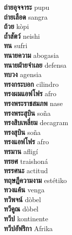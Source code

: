 \textbf{ ถ่ายอุจจาระ  } pupu \\
\textbf{ ถ่ายเลือด  } sangra \\
\textbf{ ถ้วย  } kòpi \\
\textbf{ ถ้ำสัตว์  } neishi \\
\textbf{ ทน  } sufri \\
\textbf{ ทนายความ  } abogasia \\
\textbf{ ทนายฝ่ายจำเลย  } defensa \\
\textbf{ ทบวง  } agensia \\
\textbf{ ทรงกระบอก  } cilindro \\
\textbf{ ทรงผมแอฟโฟร  } afro \\
\textbf{ ทรงพระราชสมภพ  } nase \\
\textbf{ ทรงพระสุบิน  } soña \\
\textbf{ ทรงสิบเหลี่ยม  } decagram \\
\textbf{ ทรงสุบิน  } soña \\
\textbf{ ทรงแอฟโฟร  } afro \\
\textbf{ ทรมาน  } afligí \\
\textbf{ ทรยศ  } traishoná \\
\textbf{ ทรรศนะ  } actitud \\
\textbf{ ทฤษฎีความงาม  } estétiko \\
\textbf{ ทวงแค้น  } venga \\
\textbf{ ทวิพจน์  } dòbel \\
\textbf{ ทวีคูณ  } dòbel \\
\textbf{ ทวีป  } kontinente \\
\textbf{ ทวีปอัฟริกา  } Afrika \\
